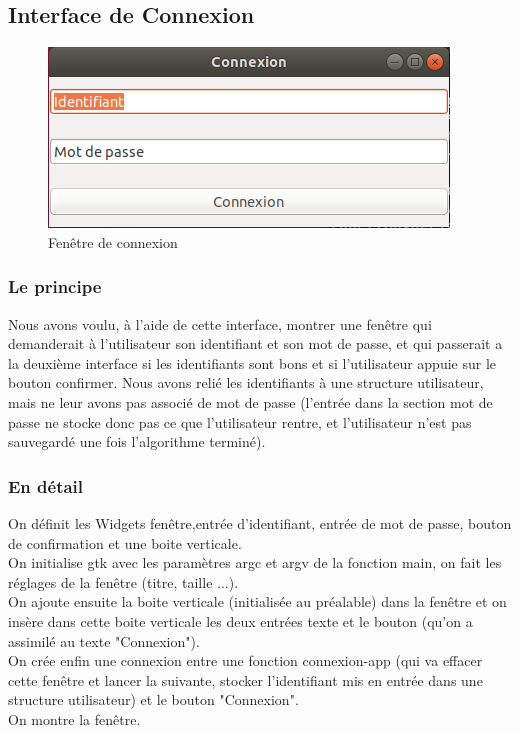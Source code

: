 \documentclass{article}
\begin{document}

\subsection{Interface de Connexion}

\begin{figure}[h]
    \centering
    \includegraphics[scale=0.8]{InterfaceConnexion.png}
    \caption{Fenêtre de connexion}
    \label{SMART}
\end{figure}

\subsubsection{Le principe}

Nous avons voulu, à l'aide de cette interface, montrer une fenêtre qui demanderait à l'utilisateur son identifiant et son mot de passe, et qui passerait a la deuxième interface si les identifiants sont bons et si l'utilisateur appuie sur le bouton confirmer. Nous avons relié les identifiants à une structure utilisateur, mais ne leur avons pas associé de mot de passe (l'entrée dans la section mot de passe ne stocke donc pas ce que l'utilisateur rentre, et l'utilisateur n'est pas sauvegardé une fois l'algorithme terminé).

\subsubsection{En détail}

On définit les Widgets fenêtre,entrée d'identifiant, entrée de mot de passe, bouton de confirmation et une boite verticale.
\noindent
\\ On initialise gtk avec les paramètres argc et argv de la fonction main, on fait les réglages de la fenêtre (titre, taille ...).
\noindent 
\\ On ajoute ensuite la boite verticale (initialisée au préalable) dans la fenêtre et on insère dans cette boite verticale les deux entrées texte et le bouton (qu'on a assimilé au texte "Connexion").
\noindent 
\\ On crée enfin une connexion entre une fonction connexion-app (qui va effacer cette fenêtre et lancer la suivante, stocker l'identifiant mis en entrée dans une structure utilisateur) et le bouton "Connexion".
\noindent
\\ On montre la fenêtre.
\end{document}
